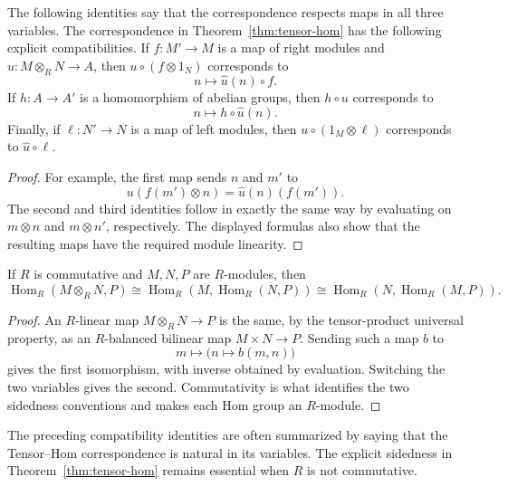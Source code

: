 \begin{proposition}\label{prop:tensor-hom-compat}
The following identities say that the correspondence respects maps in all
three variables.
The correspondence in Theorem~\ref{thm:tensor-hom} has the following
explicit compatibilities.  If \(f:M'\to M\) is a map of right modules and
\(u:M\otimes_RN\to A\), then \(u\circ(f\otimes1_N)\) corresponds to
\[
n\longmapsto\widehat u(n)\circ f.
\]
If \(h:A\to A'\) is a homomorphism of abelian groups, then \(h\circ u\)
corresponds to
\[
n\longmapsto h\circ\widehat u(n).
\]
Finally, if \(\ell:N'\to N\) is a map of left modules, then
\(u\circ(1_M\otimes\ell)\) corresponds to \(\widehat u\circ\ell\).
\end{proposition}
\begin{proof}
For example, the first map sends \(n\) and \(m'\) to
\[
u(f(m')\otimes n)=\widehat u(n)(f(m')).
\]
The second and third identities follow in exactly the same way by evaluating
on \(m\otimes n\) and \(m\otimes n'\), respectively.  The displayed
formulas also show that the resulting maps have the required module
linearity.
\end{proof}

\begin{proposition}\label{prop:comm-tensor-hom}
If \(R\) is commutative and \(M,N,P\) are \(R\)-modules, then
\[
\operatorname{Hom}_R(M\otimes_RN,P)
\cong
\operatorname{Hom}_R\!\left(M,\operatorname{Hom}_R(N,P)\right)
\cong
\operatorname{Hom}_R\!\left(N,\operatorname{Hom}_R(M,P)\right).
\]
\end{proposition}
\begin{proof}
An \(R\)-linear map \(M\otimes_RN\to P\) is the same, by the tensor-product
universal property, as an \(R\)-balanced bilinear map \(M\times N\to P\).
Sending such a map \(b\) to
\[
m\longmapsto\bigl(n\longmapsto b(m,n)\bigr)
\]
gives the first isomorphism, with inverse obtained by evaluation.  Switching
the two variables gives the second.  Commutativity is what identifies the
two sidedness conventions and makes each Hom group an \(R\)-module.
\end{proof}

\begin{remark}
The preceding compatibility identities are often summarized by saying that
the Tensor--Hom correspondence is natural in its variables.  The explicit
sidedness in Theorem~\ref{thm:tensor-hom} remains essential when \(R\) is
not commutative.
\end{remark}

